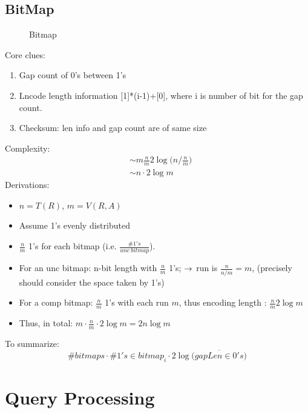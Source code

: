 \documentclass{article}
\begin{document}
\subsection{BitMap}
\begin{figure}[H]
\centering
{}
\caption{Bitmap}
\label{fig:LABEL}
\end{figure}
Core clues:
\begin{enumerate}
\item Gap count of 0's between 1's
\item Lncode length information [1]*(i-1)+[0], where i is number of bit for the gap count.
\item Checksum: len info and gap count are of same size
\end{enumerate}
Complexity: 
\begin{align*}
& \sim m \frac{n}{m} 2\log\Big(n/\frac{n}{m} \Big) \\
& \sim n \cdot 2\log m 
\end{align*}
Derivations:
\begin{itemize}
\item $n = T(R)$, $m = V(R, A)$
\item Assume 1's evenly distributed 
\item $\frac{n}{m}$ 1's for each bitmap (i.e. $\frac{\#1's}{unc\ bitmap}$).
\item For an unc bitmap: n-bit length with $\frac{n}{m}$ 1's; $\rightarrow$ run is $\frac{n}{n/m}=m$, (precisely should consider the space taken by 1's)
\item For a comp bitmap: $\frac{n}{m}$ 1's with each run $m$, thus encoding length : $\frac{n}{m} 2 \log m$
\item Thus, in total: $m \cdot \frac{n}{m} \cdot 2 \log{m} = 2n\log m$
\end{itemize}

To summarize: 
$$
\#bitmaps \cdot \#1's\in bitmap_i \cdot 2\log\Big(\overline{gapLen\in 0's}\Big)
$$


\section{Query Processing}
\end{document}
